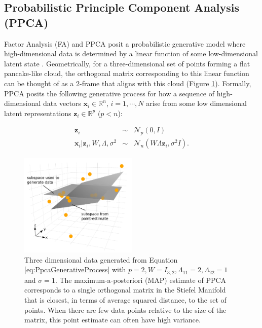 \documentclass[ba]{imsart}
\newcommand{\mb}[1]{\mathbf{#1}}
\numberwithin{equation}{section}
\theoremstyle{plain}
\begin{document}
\subsection{Probabilistic Principle Component Analysis (PPCA)}
Factor Analysis (FA) and PPCA \citep{tipping1999probabilistic} posit a probabilistic generative model where high-dimensional data is determined by a linear function of some low-dimensional latent state \cite[Chapt.~12]{murphy2012machine}. Geometrically, for a three-dimensional set of points forming a flat pancake-like cloud, the orthogonal matrix corresponding to this linear function can be thought of as a $2$-frame that aligns with this cloud (Figure \ref{fig:MleSubspaceEstimate}). Formally, PPCA posits the following generative process for how a sequence of high-dimensional data vectors $\mathbf{x}_i \in \mathbb{R}^n$, $i = 1, \cdots, N$ arise from some low dimensional latent representations $\mathbf{z}_i \in \mathbb{R}^p$ ($p < n$):

\begin{eqnarray}
\label{eq:PpcaGenerativeProcess}
\mb{z}_i &\sim& \mathcal{N}_p(0, I) \nonumber\\
\mb{x}_i | \mb{z}_i, W, \Lambda, \sigma^2 &\sim& \mathcal{N}_n(W \Lambda \mb{z}_i, \sigma^2 I).
\end{eqnarray}

\begin{figure}[h]
\centering
\vspace{.1in}
\includegraphics[width=0.5\textwidth]{figures/uncertainty_atz.pdf}
\vspace{.05in}
\caption{Three dimensional data generated from Equation \ref{eq:PpcaGenerativeProcess} with $p = 2, W = I_{3,2}, \Lambda_{11} = 2, \Lambda_{22} = 1$ and $\sigma = 1$. The maximum-a-posteriori (MAP) estimate of PPCA corresponds to a single orthogonal matrix in the Stiefel Manifold that is closest, in terms of average squared distance, to the set of points. When there are few data points relative to the size of the matrix, this point estimate can often have high variance.}
\label{fig:MleSubspaceEstimate}
\end{figure}
\end{document}
